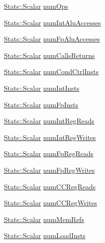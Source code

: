 \begin{DoxyCompactItemize}
\item 
\hyperlink{classStats_1_1Scalar}{Stats::Scalar} \hyperlink{classBaseSimpleCPU_a121c14c0d2e80edfe1e3d01031707c0b}{numOps}
\item 
\hyperlink{classStats_1_1Scalar}{Stats::Scalar} \hyperlink{classBaseSimpleCPU_a416968ef3d43f2bd9da001865a53a90b}{numIntAluAccesses}
\item 
\hyperlink{classStats_1_1Scalar}{Stats::Scalar} \hyperlink{classBaseSimpleCPU_aecffaf5b7016d2d991dd5e1de1a8946e}{numFpAluAccesses}
\item 
\hyperlink{classStats_1_1Scalar}{Stats::Scalar} \hyperlink{classBaseSimpleCPU_a18b716819072434f709f1513e5078168}{numCallsReturns}
\item 
\hyperlink{classStats_1_1Scalar}{Stats::Scalar} \hyperlink{classBaseSimpleCPU_a23ee17e43ac73ad292d6ffb605293364}{numCondCtrlInsts}
\item 
\hyperlink{classStats_1_1Scalar}{Stats::Scalar} \hyperlink{classBaseSimpleCPU_a9e5a156bac1cb43d66b86372e17da1bd}{numIntInsts}
\item 
\hyperlink{classStats_1_1Scalar}{Stats::Scalar} \hyperlink{classBaseSimpleCPU_a925ac62d7f57c791a98868d640c3d195}{numFpInsts}
\item 
\hyperlink{classStats_1_1Scalar}{Stats::Scalar} \hyperlink{classBaseSimpleCPU_ae7061027b5edb87b145bf1ebf1720c37}{numIntRegReads}
\item 
\hyperlink{classStats_1_1Scalar}{Stats::Scalar} \hyperlink{classBaseSimpleCPU_a57ac9b75469edc84c4cde5fbc967cd06}{numIntRegWrites}
\item 
\hyperlink{classStats_1_1Scalar}{Stats::Scalar} \hyperlink{classBaseSimpleCPU_a958575f0f033dd22c762ca5e2be64034}{numFpRegReads}
\item 
\hyperlink{classStats_1_1Scalar}{Stats::Scalar} \hyperlink{classBaseSimpleCPU_a7b705046e187b82706fb786e8e8edd1a}{numFpRegWrites}
\item 
\hyperlink{classStats_1_1Scalar}{Stats::Scalar} \hyperlink{classBaseSimpleCPU_a949ece84cfe5ba6af93b85de367806ef}{numCCRegReads}
\item 
\hyperlink{classStats_1_1Scalar}{Stats::Scalar} \hyperlink{classBaseSimpleCPU_a0bd5bc278dffd538498c492e41831997}{numCCRegWrites}
\item 
\hyperlink{classStats_1_1Scalar}{Stats::Scalar} \hyperlink{classBaseSimpleCPU_a6102e519d600e5e0f2d310d628f9a361}{numMemRefs}
\item 
\hyperlink{classStats_1_1Scalar}{Stats::Scalar} \hyperlink{classBaseSimpleCPU_ae7c222b5c2c639802515df29884a7576}{numLoadInsts}

\end{DoxyCompactItemize}
